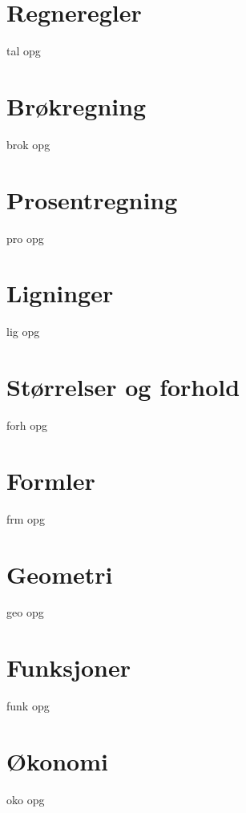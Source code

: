 



\graphicspath{{kap0/}}


\newpage

{\footnotesize \tableofcontents}
\chapter{Regneregler \label{Rreg}}
{tal}
\newpage
{opg}
\chapter{Brøkregning \label{Br}}
\newpage
{brok}
\newpage
{opg}

\chapter{Prosentregning \label{Pro}}
{pro}
\newpage
{opg}

\chapter{Ligninger \label{Lig}}
{lig}
\newpage
{opg}

\chapter{Størrelser og forhold}
{forh}
\newpage
{opg}

\chapter{Formler}
{frm}
\newpage
{opg}

\chapter{Geometri}
{geo}
\newpage
{opg}

\chapter{Funksjoner}
{funk}
\newpage
{opg}

\chapter{Økonomi \label{Oko}}
{oko}
\newpage
{opg}

